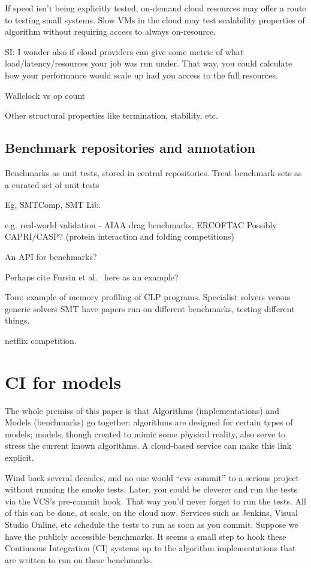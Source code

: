 \documentclass[conference]{IEEEtran}
\begin{document}
If speed isn't being explicitly tested, on-demand cloud resources 
may offer a route to testing small systems. Slow VMs in the cloud
may test scalability properties of algorithm without requiring access
to always on-resource.

SI: I wonder also if cloud providers can give some metric of what
load/latency/resources your job was run under.  That way, you could
calculate how your performance would scale up had you access to the
full resources. 


Wallclock vs op count

Other structural properties like termination, stability, etc. 

\subsection{Benchmark repositories and annotation}


Benchmarks as unit tests, stored in central repositories. 
Treat benchmark sets as a curated set of unit tests

Eg, SMTComp, SMT Lib. 

e.g. real-world validation - AIAA drag benchmarks, ERCOFTAC
	Possibly CAPRI/CASP? (protein interaction and folding competitions)

An API for benchmarks? 

Perhaps cite Fursin et al.~\cite{fursin-et-al:2014} here as an example?

Tom: 
example of memory profiling of CLP programs. Specialist solvers versus 
generic solvers SMT have papers run on different benchmarks, testing different 
things. 

netflix competition. 

\section{CI for models}


The whole premiss of this paper is that Algorithms (implementations)
and Models (benchmarks) go together: algorithms are designed for
certain types of models; models, though created to mimic some physical
reality, also serve to stress the current known algorithms. A
cloud-based service can make this link explicit.

Wind back several decades, and no one would ``cvs commit'' to a
serious project without running the smoke tests. Later, you could be
cleverer and run the tests via the VCS's pre-commit hook. That way
you'd never forget to run the tests. All of this can be done, at
scale, on the cloud now. Services such as Jenkins, Visual Studio
Online, etc schedule the tests to run as soon as you commit. Suppose
we have the publicly accessible benchmarks. It seems a small step to
hook these Continuous Integration (CI) systems up to the algorithm
implementations that are written to run on these benchmarks.
\end{document}
